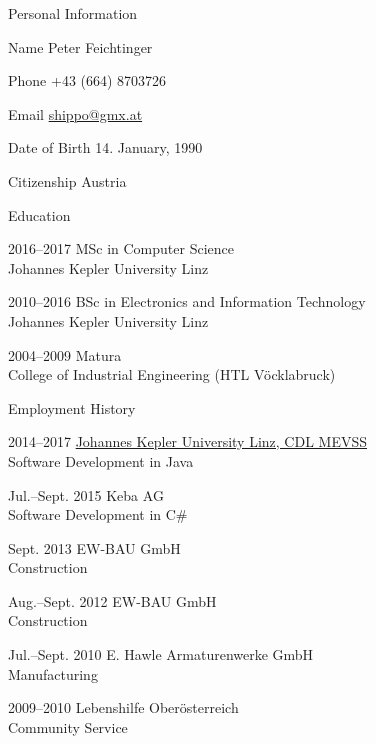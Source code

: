 \begin{cv}{}
  \begin{cvlist}{Personal Information}
    \setlength{\itemsep}{-0.4\baselineskip plus 1pt minus 1pt}
    \item[Name] Peter Feichtinger
    \item[Phone] +43 (664) 8703726
    \item[Email] \href{mailto:shippo@gmx.at}{shippo@gmx.at}
    \item[Date of Birth] 14. January, 1990
    \item[Citizenship] Austria
  \end{cvlist}
 
  \begin{cvlist}{Education}
    \item[2016--2017] MSc in Computer Science\\Johannes Kepler University Linz
    \item[2010--2016] BSc in Electronics and Information Technology\\Johannes Kepler University Linz
    \item[2004--2009] Matura\\College of Industrial Engineering (HTL Vöcklabruck)
  \end{cvlist}
  
  \begin{cvlist}{Employment History}
    \setlength{\itemsep}{-0.15\baselineskip plus 1pt minus 1pt}
    \item[2014--2017] \href{http://mevss.jku.at/?page_id=533}{Johannes Kepler University Linz, CDL MEVSS}\\
      Software Development in Java
    \item[Jul.--Sept. 2015] Keba AG\\Software Development in C\#
    \item[Sept. 2013] EW-BAU GmbH\\Construction
    \item[Aug.--Sept. 2012] EW-BAU GmbH\\Construction
    \item[Jul.--Sept. 2010] E. Hawle Armaturenwerke GmbH\\Manufacturing
    \item[2009--2010] Lebenshilfe Oberösterreich\\Community Service
  \end{cvlist}
\end{cv}
